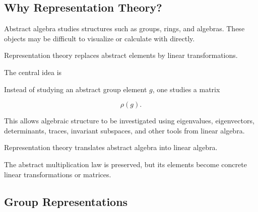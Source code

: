 \subsection{Why Representation Theory?}
\label{subsec:why-representation-theory}

Abstract algebra studies structures such as groups, rings, and algebras.
These objects may be difficult to visualize or calculate with directly.

Representation theory replaces abstract elements by linear transformations.

The central idea is

\begin{center}
\end{center}

Instead of studying an abstract group element \(g\), one studies a matrix

\[ \rho(g). \]

This allows algebraic structure to be investigated using eigenvalues,
eigenvectors, determinants, traces, invariant subspaces, and other tools from
linear algebra.

\begin{conceptbox}
Representation theory translates abstract algebra into linear algebra.

The abstract multiplication law is preserved, but its elements become
concrete linear transformations or matrices.
\end{conceptbox}

\subsection{Group Representations}
\label{subsec:group-representations}

